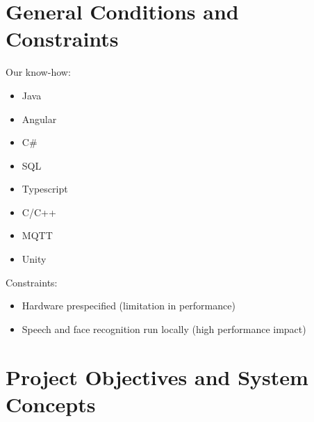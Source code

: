 \documentclass[12pt]{article}
\theoremstyle{definition}
\begin{document}
\pagebreak

\section{General Conditions and Constraints}

Our know-how:
\begin{itemize}
	\item Java
	\item Angular
	\item C\#
	\item SQL
	\item Typescript
	\item C/C++
	\item MQTT
	\item Unity
\end{itemize}
Constraints:
\begin{itemize}
	\item Hardware prespecified (limitation in performance)
	\item Speech and face recognition run locally (high performance impact)
\end{itemize}

\pagebreak

\section{Project Objectives and System Concepts}
\end{document}
